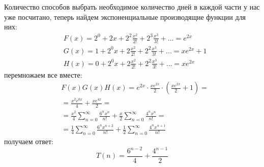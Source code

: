 \documentclass[a4paper,12pt]{article}
\begin{document}
\begin{Solution}
Количество способов выбрать необходимое количество дней в каждой части у нас уже посчитано, теперь найдем экспоненциальные производящие функции для них:
\[
	\begin{split}
		& F\left(x\right) = 2^0 + 2 x + 2^2 \frac{x^2}{2!} + 2^3 \frac{x^3}{3!} + ... = e^{2x} \\
		& G\left(x\right) = 1 + 2^0 x + 2 \frac{x^2}{2!} + 2^2 \frac{x^3}{3!} + ...  = x e^{2x} + 1 \\
		& H\left(x\right) = 0 + 2^0 x + 2 \frac{x^2}{2!} + 2^2 \frac{x^3}{3!} + ... = x e^{2x}
	\end{split}
\]
перемножаем все вместе:
\[
	\begin{split}
		& F\left(x\right) G\left(x\right) H\left(x\right) = e^{2x} \cdot \frac{x e^{2x}}{2} \cdot \left(\frac{x e^{2x}}{2} + 1\right) = \\
		& = \frac{x^2 e^{6x}}{4} + \frac{x e^{4x}}{2} = \\
		& = \frac{x^2}{4} \sum_{n=0}^{\infty} \frac{6^n x^n}{n!} + \frac{x}{2} \sum_{n=0}^{\infty} \frac{4^n x^n}{n!} = \\
		& = \frac{1}{4} \sum_{n=0}^{\infty} \frac{6^n x^{n+2}}{n!} + \frac{1}{2} \sum_{n=0}^{\infty} \frac{4^n x^{n+1}}{n!}
	\end{split}
\]
получаем ответ:
\[
	T\left(n\right) = \frac{6^{n-2}}{4} + \frac{4^{n-1}}{2}
\]
\end{Solution}
\end{document}

